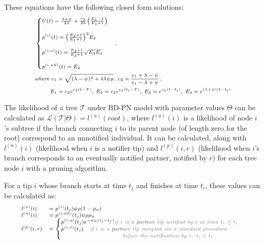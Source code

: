 \documentclass[a4paper,10pt]{article}
\begin{document}
These equations have the following closed form solutions:
\begin{equation}
\scriptsize
\begin{split}
&\begin{cases}
U(t) = \frac{\lambda + \psi}{2\lambda} +  \frac{c_1}{2\lambda}\Big(\frac{E_1 - 1}{E_1 + 1}\Big)\\
\\
p^{(i)}(t) = \Big(\frac{E_2 + 1}{E_1 + 1}\Big)^2E_3 \\
\\
p^{(i,o)}(t) =  \frac{E_2 + 1}{E_1 + 1}\sqrt{E_3E_4} \\
\\
p^{(i,nh)}(t) =  E_4
\end{cases},\\
& \textit{where } c_1 = \sqrt{(\lambda - \psi)^2 + 4 \lambda\psi\rho},\; c_2 = \frac{c_1 + \lambda - \psi}{c_1 - \lambda + \psi},\\
& ~~~~~~~~E_1 = c_2 e^{c_1 (t -T)},\; E_2 = c_2 e^{c_1 (t_i -T)},\; E_3 = e^{c_1 (t -t_i)}, \; E_4 =  e^{(\lambda + \psi) (t -t_i)}\\
\end{split}
\end{equation}


The likelihood of a tree $\mathscr{T}$ under BD-PN model with parameter values $\Theta$ can be calculated as $\mathscr{L}(\mathscr{T}|\Theta) = l^{(u)}(root)$, where $l^{(u)}(i)$ is a likelihood of node $i$'s subtree if the branch connecting $i$ to its parent node (of length zero for the root) correspond to an unnotified individual. It can be calculated, along with $l^{(n)}(i)$ (likelihood when $i$ is a notifier  tip) and $l^{(p)}(i, r)$ (likelihood when $i$'s branch corresponds to an eventually notified partner, notified by $r$) for each tree node $i$ with a pruning algorithm.


For a tip $i$ whose branch starts at time $t_j$ and finishes at time $t_i$, these values can be calculated as:
\begin{equation}
\scriptsize
\begin{array}{ll}
l^{(u)}(i) &= p^{(i)}(t_j)\psi\rho (1-\rho_{n})\\
l^{(n)}(i) &= p^{(i,nh)}(t_j)\psi\rho \rho_{n}\\
l^{(p)}(i, r) &=\begin{cases}
p^{(r, o)}(t_j) e^{- \psi_n (t_i - t_r)} \textit{\color{gray} if $i$ is a \textbf{partner} tip notified by $r$ at time $t_r \leq t_i$}\\
p^{(i, o)}(t_j) \textit{\color{gray}~~ if $i$ is a \textbf{partner} tip sampled via a standard procedure} \\
~~~~~~~~~~~~~~~~~~~~~~~~~~~~~~~~\textit{\color{gray} before the notification by $r$: $t_i < t_r$}\\
\end{cases}
\end{array}
\end{equation}
\end{document}
